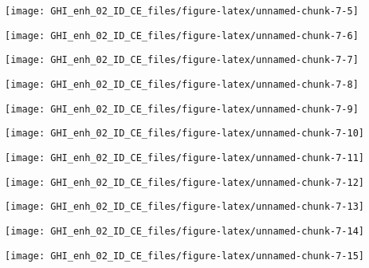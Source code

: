 \documentclass[
  10pt,
  a4paper,oneside]{article}
\begin{document}
\begin{center}\texttt{[image: GHI\_enh\_02\_ID\_CE\_files/figure-latex/unnamed-chunk-7-5]} \end{center}

\begin{center}\texttt{[image: GHI\_enh\_02\_ID\_CE\_files/figure-latex/unnamed-chunk-7-6]} \end{center}

\begin{center}\texttt{[image: GHI\_enh\_02\_ID\_CE\_files/figure-latex/unnamed-chunk-7-7]} \end{center}

\begin{center}\texttt{[image: GHI\_enh\_02\_ID\_CE\_files/figure-latex/unnamed-chunk-7-8]} \end{center}

\begin{center}\texttt{[image: GHI\_enh\_02\_ID\_CE\_files/figure-latex/unnamed-chunk-7-9]} \end{center}

\begin{center}\texttt{[image: GHI\_enh\_02\_ID\_CE\_files/figure-latex/unnamed-chunk-7-10]} \end{center}

\begin{center}\texttt{[image: GHI\_enh\_02\_ID\_CE\_files/figure-latex/unnamed-chunk-7-11]} \end{center}

\begin{center}\texttt{[image: GHI\_enh\_02\_ID\_CE\_files/figure-latex/unnamed-chunk-7-12]} \end{center}

\begin{center}\texttt{[image: GHI\_enh\_02\_ID\_CE\_files/figure-latex/unnamed-chunk-7-13]} \end{center}

\begin{center}\texttt{[image: GHI\_enh\_02\_ID\_CE\_files/figure-latex/unnamed-chunk-7-14]} \end{center}

\begin{center}\texttt{[image: GHI\_enh\_02\_ID\_CE\_files/figure-latex/unnamed-chunk-7-15]} \end{center}
\end{document}
